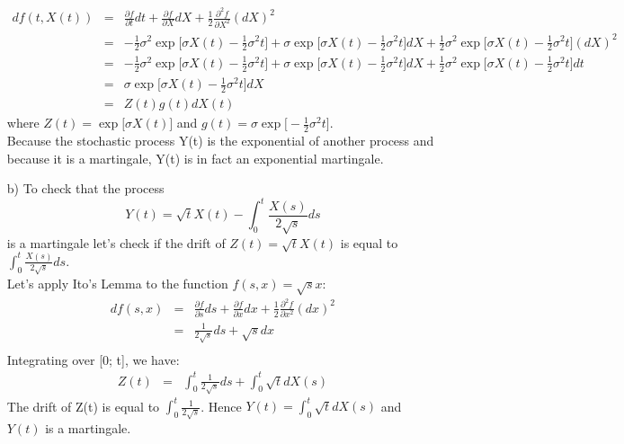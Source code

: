\documentclass[11pt,oneside,a4paper, titlepage]{article}
\begin{document}
\begin{enumerate}
\begin{eqnarray*}
df(t, X(t))&=&\frac{\partial f}{\partial t} dt + \frac{\partial f}{\partial X}dX + \frac{1}{2}\frac{\partial^2 f}{\partial X^2} (dX)^2\\
&=&-\frac{1}{2}\sigma^2 \exp\big[\sigma X(t)-\frac{1}{2}\sigma^2 t\big] + \sigma \exp[\sigma X(t)-\frac{1}{2}\sigma^2 t\big]dX + \frac{1}{2} \sigma^2 \exp[\sigma X(t)-\frac{1}{2}\sigma^2 t\big] (dX)^2\\
&=&-\frac{1}{2}\sigma^2 \exp\big[\sigma X(t)-\frac{1}{2}\sigma^2 t\big] + \sigma \exp\big[\sigma X(t)-\frac{1}{2}\sigma^2 t\big]dX + \frac{1}{2} \sigma^2 \exp[\sigma X(t)-\frac{1}{2}\sigma^2 t\big] dt\\
&=&\sigma \exp\big[\sigma X(t)-\frac{1}{2}\sigma^2 t\big]dX\\
&=&Z(t)g(t)dX(t)
\end{eqnarray*}
where \(Z(t)=\exp\big[\sigma X(t)\big]\) and \(g(t)=\sigma\exp\big[-\frac{1}{2}\sigma^2 t\big] \).\\
Because the stochastic process Y(t) is the exponential of another
process and because it is a martingale, Y(t) is in fact 
an exponential martingale.
\item [b)] To check that the process 
\begin{displaymath}
Y(t)=\sqrt{t}X(t)-\int_{0}^{t}\frac{X(s)}{2\sqrt{s}}ds
\end{displaymath}
is a martingale let's check if the drift of 
\(Z(t)=\sqrt{t}X(t)\) is equal to  \(\int_{0}^{t}\frac{X(s)}{2\sqrt{s}}ds\).\\
Let's apply Ito's Lemma to the function \(f(s,x)=\sqrt{s}x\):
\begin{eqnarray*}
df(s, x)&=&\frac{\partial f}{\partial s} ds+\frac{\partial f}{\partial x}dx+\frac{1}{2}\frac{\partial^2 f}{\partial x^2}(dx)^2\\
&=&\frac{1}{2\sqrt{s}} ds + \sqrt{s}dx\\
\end{eqnarray*}
Integrating over [0; t], we have:
\begin{eqnarray*}
Z(t)&=&\int_{0}^{t}\frac{1}{2\sqrt{s}} ds + \int_{0}^{t}\sqrt{t}dX(s)
\end{eqnarray*}
The drift of Z(t) is equal to \(\int_{0}^{t}\frac{1}{2\sqrt{s}}\). Hence 
\(Y(t) =  \int_{0}^{t}\sqrt{t}dX(s)\) and \(Y(t)\) is a martingale.
\end{enumerate}
\end{document}

